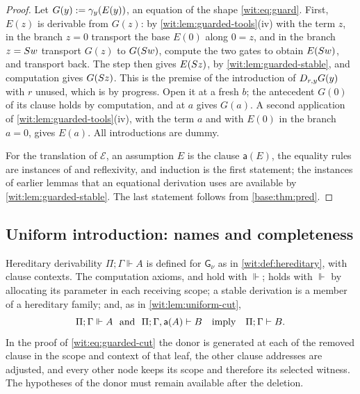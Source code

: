 \begin{proof}
Let $G(y)\mathrel{:=}\gamma_y(E(y))$, an equation of the shape
\eqref{wit:eq:guard}.  First, $E(z)$ is derivable from $G(z)$: by
\cref{wit:lem:guarded-tools}(iv) with the term $z$, in the branch $z=0$
transport the base $E(0)$ along $0=z$, and in the branch $z=S w$
transport $G(z)$ to $G(S w)$, compute the two gates to obtain
$E(S w)$, and transport back.  The step then gives $E(S z)$, by
\cref{wit:lem:guarded-stable}, and computation gives $G(S z)$.  This is
the premise of the introduction of $D_{r,y}G(y)$ with $r$ unused, which is
by progress.  Open it at a fresh $b$; the antecedent $G(0)$ of its clause
holds by computation, and  at $a$ gives $G(a)$.  A second
application of \cref{wit:lem:guarded-tools}(iv), with the term $a$ and with
$E(0)$ in the branch $a=0$, gives $E(a)$.  All introductions are dummy.

For the translation of $\mathcal E$, an assumption $E$ is the clause
$\mathsf{a}(E)$, the equality rules are instances of  and
reflexivity, and induction is the first statement; the instances of earlier
lemmas that an equational derivation uses are available by
\cref{wit:lem:guarded-stable}.  The last statement follows from
\cref{base:thm:pred}.
\end{proof}

\subsection{Uniform introduction: names and completeness}

Hereditary derivability $\Pi;\Gamma\Vdash A$ is defined for
$\mathsf{G}_{\nu}$ as in \cref{wit:def:hereditary}, with clause contexts.
The computation axioms,  and  hold with
$\Vdash$;  holds with $\Vdash$ by allocating its parameter in
each receiving scope; a stable derivation is a member of a hereditary
family; and, as in \cref{wit:lem:uniform-cut},
\begin{equation}
 \Pi;\Gamma\Vdash A\ \text{ and }\ \Pi;\Gamma,\mathsf{a}(A)\proves B
 \quad\text{imply}\quad\Pi;\Gamma\proves B .
 \label{wit:eq:guarded-cut}
\end{equation}
In the proof of \eqref{wit:eq:guarded-cut} the donor is generated at each
 of the removed clause in the scope and context of that leaf,
the other clause addresses are adjusted, and every other node keeps its
scope and therefore its selected witness.  The hypotheses of the donor must
remain available after the deletion.

